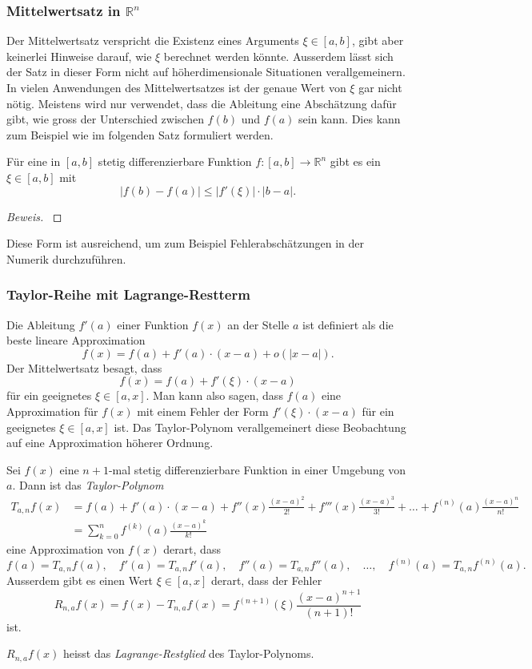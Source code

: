 \subsubsection{Mittelwertsatz in $\mathbb R^n$}
Der Mittelwertsatz verspricht die Existenz eines Arguments $\xi\in[a,b]$,
gibt aber keinerlei Hinweise darauf, wie $\xi$ berechnet werden könnte. 
Ausserdem lässt sich der Satz in dieser Form nicht auf höherdimensionale
Situationen verallgemeinern.
In vielen Anwendungen des Mittelwertsatzes ist der genaue Wert von $\xi$
gar nicht nötig.
Meistens wird nur verwendet, dass die Ableitung eine Abschätzung dafür
gibt, wie gross der Unterschied zwischen $f(b)$ und $f(a)$ sein kann.
%
Dies kann zum Beispiel wie im folgenden Satz formuliert werden.

\begin{satz}
Für eine in $[a,b]$ stetig differenzierbare Funktion
$f\colon [a,b]\to\mathbb R^n$ gibt es ein $\xi\in[a,b]$ mit
\[
|f(b)-f(a)| \le |f'(\xi)|\cdot |b-a|.
\]
\end{satz}

\begin{proof}[Beweis]
\cite[(8.5.1)]{buch:dieudonne}
\end{proof}

Diese Form ist ausreichend, um zum Beispiel Fehlerabschätzungen in der
Numerik durchzuführen.
%

\subsubsection{Taylor-Reihe mit Lagrange-Restterm}
%
%
Die Ableitung $f'(a)$ einer Funktion $f(x)$ an der Stelle $a$ ist definiert
als die beste lineare Approximation
\[
f(x) = f(a) + f'(a)\cdot (x-a) + o(|x-a|).
\]
Der Mittelwertsatz besagt, dass
\[
f(x) = f(a) + f'(\xi) \cdot (x-a)
\]
für ein geeignetes $\xi\in[a,x]$.
Man kann also sagen, dass $f(a)$ eine Approximation für $f(x)$ mit einem
Fehler der Form $f'(\xi)\cdot(x-a)$ für ein geeignetes $\xi\in[a,x]$ ist.
Das Taylor-Polynom verallgemeinert diese Beobachtung auf eine Approximation
höherer Ordnung.

\begin{satz}
Sei $f(x)$ eine $n+1$-mal stetig differenzierbare Funktion in einer
Umgebung von $a$.
Dann ist das {\em Taylor-Polynom}
\begin{align*}
T_{a,n}f(x)
&=
f(a) + f'(a)\cdot (x-a) + f''(x)\frac{(x-a)^2}{2!} + f'''(x)\frac{(x-a)^3}{3!}
+\dots+f^{(n)}(a)\frac{(x-a)^n}{n!}
\\
&=
\sum_{k=0}^n
f^{(k)}(a) \frac{(x-a)^k}{k!}
\end{align*}
eine Approximation von $f(x)$ derart, dass
\[
f(a)=T_{a,n}f(a),\quad
f'(a)=T_{a,n}f'(a),\quad
f''(a)=T_{a,n}f''(a),\quad
\dots,\quad
f^{(n)}(a)=T_{a,n}f^{(n)}(a).
\]
Ausserdem gibt es einen Wert $\xi\in[a,x]$ derart, dass der Fehler
%
\[
R_{n,a}f(x)
=
f(x) - T_{n,a}f(x)
=
f^{(n+1)}(\xi)\frac{(x-a)^{n+1}}{(n+1)!}
\]
ist.
\end{satz}
%
$R_{n,a}f(x)$ heisst das {\em Lagrange-Restglied} des Taylor-Polynoms.
%

